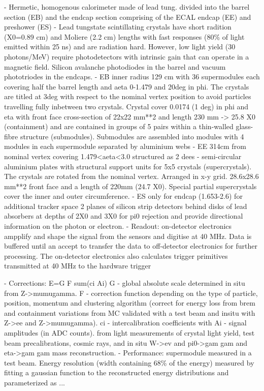 - Hermetic, homogenous calorimeter made of lead tung. divided into the barrel section (EB) and the endcap section comprising of the ECAL endcap (EE) and preshower (ES)
- Lead tungstate scintillating crystals have short radition (X0=0.89 cm) and Moliere (2.2 cm) lengths with fast responses (80\% of light emitted within 25 ns) and are radiation hard. However, low light yield (30 photons/MeV) require photodetectors with intrinsic gain that can operate in a magnetic field. Silicon avalanche photodiodes in the barrel and vacuum phototriodes in the endcaps.
- EB inner radius 129 cm with 36 supermodules each covering half the barrel length and aeta 0-1.479 and 20deg in phi. The crystals are titled at 3deg with respect to the nominal vertex position to avoid particles travelling fully inbetween two crystals. Crystal cover 0.0174 (1 deg) in phi and eta with front face cross-section of 22x22 mm**2 and length 230 mm -> 25.8 X0 (containment) and are contained in groups of 5 pairs within a thin-walled glass-fibre structure (submodules). Submodules are assembled into modules with 4 modules in each supermodule separated by aluminium webs
- EE 314cm from nominal vertex covering 1.479<aeta<3.0 structured as 2 dees - semi-circular aluminium plates with structural support units for 5x5 crystals (supercrystals). The crystals are rotated from the nominal vertex. Arranged in x-y grid. 28.6x28.6 mm**2 front face and a length of 220mm (24.7 X0). Special partial supercrystals cover the inner and outer circumference.
- ES only for endcap (1.653-2.6) for additional tracker space 2 planes of silicon strip detectors behind disks of lead absorbers at depths of 2X0 and 3X0 for pi0 rejection and provide directional information on the photon or electron.
- Readout: on-detector electronics ampplify and shape the signal from the sensors and digitise at 40 MHz. Data is buffered until an accept to transfer the data to off-detector electronics for further processing. The on-detector electronics also calculates trigger primitives transmitted at 40 MHz to the hardware trigger

- Corrections: E=G F sum(ci Ai)
G - global absolute scale determined in situ from Z->mumugamma. F - correction function depending on the type of particle, position, momentum and clustering algorithm (correct for energy loss from brem and containment variations from MC validated with a test beam and insitu with Z->ee and Z->mumugamma). ci - intercalibration coefficients with Ai - signal amplitudes (in ADC counts).
from light measurements  of crystal light yield, test beam precalibrations, cosmic rays, and in situ W->ev and pi0->gam gam and eta->gam gam mass reconstruction.
- Performance: supermodule measured in a test beam. Energy resolution (width containing 68\% of the energy) measured by fitting a gaussian function to the reconstructed energy distributions and parameterized as
...


